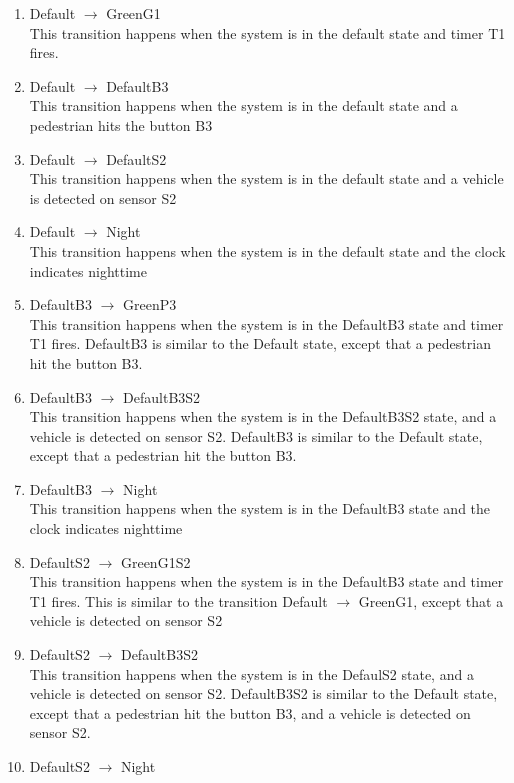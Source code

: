 \documentclass[letterpaper,12pt]{article}
\begin{document}
\begin{enumerate}
 \item Default $\rightarrow$ GreenG1\\
       This transition happens when the system is in the default state and timer T1 fires.
 \item Default $\rightarrow$ DefaultB3\\
       This transition happens when the system is in the default state and a pedestrian hits the button B3
 \item Default $\rightarrow$ DefaultS2\\
       This transition happens when the system is in the default state and a vehicle is detected on sensor S2
 \item Default $\rightarrow$ Night\\
       This transition happens when the system is in the default state and the clock indicates nighttime
 \item DefaultB3 $\rightarrow$ GreenP3\\
       This transition happens when the system is in the DefaultB3 state and timer T1 fires.
       DefaultB3 is similar to the Default state, except that a pedestrian hit the button B3.
 \item DefaultB3 $\rightarrow$ DefaultB3S2\\
       This transition happens when the system is in the DefaultB3S2 state, and a vehicle is detected on sensor S2. DefaultB3 is similar to the Default state, except that a pedestrian hit the button B3.
 \item DefaultB3 $\rightarrow$ Night\\
       This transition happens when the system is in the DefaultB3 state and the clock indicates nighttime
 \item DefaultS2 $\rightarrow$ GreenG1S2\\
       This transition happens when the system is in the DefaultB3 state and timer T1 fires.
       This is similar to the transition Default $\rightarrow$ GreenG1, except that a vehicle
       is detected on sensor S2
 \item DefaultS2 $\rightarrow$ DefaultB3S2\\
       This transition happens when the system is in the DefaulS2 state, and a vehicle is detected on sensor S2. DefaultB3S2 is similar to the Default state, except that a pedestrian hit the button B3, and a vehicle is detected on sensor S2.
 \item DefaultS2 $\rightarrow$ Night\\

\end{enumerate}
\end{document}
